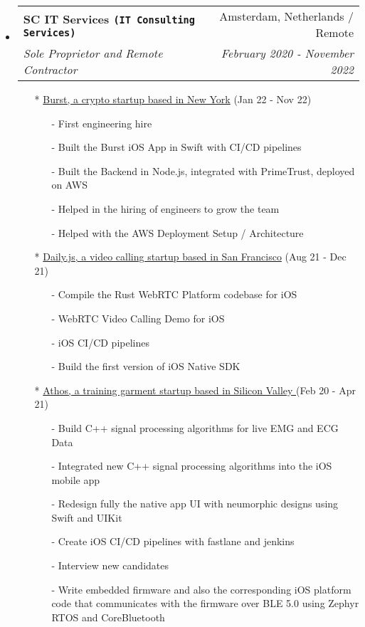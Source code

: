 \documentclass[letterpaper,11pt]{article}
\makeatletter
\newcommand{\ressubheading}[4]{
\begin{tabular*}{7.0in}{l@{\extracolsep{\fill}}r}
    \textbf{#1} & #2 \\
    \textit{#3} & \textit{#4} \\
\end{tabular*}\vspace{-6pt}}
\makeatother
\begin{document}
\begin{itemize}
\item
    \ressubheading{{SC IT Services \texttt{(IT Consulting Services)}}}{Amsterdam, Netherlands / Remote}{Sole Proprietor and Remote Contractor}{February 2020 - November 2022}
    \begin{itemize}    
        \item[*] \href{https://www.joinburst.com}{Burst, a crypto startup based in New York} (Jan 22 - Nov 22)
        \begin{itemize}   
        \item[-]{First engineering hire}
        \item[-]{Built the Burst iOS App in Swift with CI/CD pipelines}
        \item[-]{Built the Backend in Node.js, integrated with PrimeTrust, deployed on AWS}
        \item[-]{Helped in the hiring of engineers to grow the team}
        \item[-]{Helped with the AWS Deployment Setup / Architecture}
        \end{itemize}
        \item[*] \href{https://daily.co}{Daily.js, a video calling startup based in San Francisco} 
        (Aug 21 - Dec 21)
        \begin{itemize}    
        \item[-]{Compile the Rust WebRTC Platform codebase for iOS}
        \item[-]{WebRTC Video Calling Demo for iOS}
        \item[-]{iOS CI/CD pipelines}
        \item[-]{Build the first version of iOS Native SDK}
        \end{itemize}
        \item[*] \href{https://www.crunchbase.com/organization/athos}{Athos, a training garment startup based in Silicon Valley }(Feb 20 - Apr 21)
        \begin{itemize}
        \item[-]{Build C++ signal processing algorithms for live EMG and ECG Data}
        \item[-]{Integrated new C++ signal processing algorithms into the iOS mobile app}
        \item[-]{Redesign fully the native app UI with neumorphic designs using Swift and UIKit}
        \item[-]{Create iOS CI/CD pipelines with fastlane and jenkins}
        \item[-]{Interview new candidates}
        \item[-]{Write embedded firmware and also the corresponding iOS platform code that communicates with the firmware over BLE 5.0 using Zephyr RTOS and CoreBluetooth}
        \end{itemize}
    \end{itemize}


\end{itemize}
\end{document}
